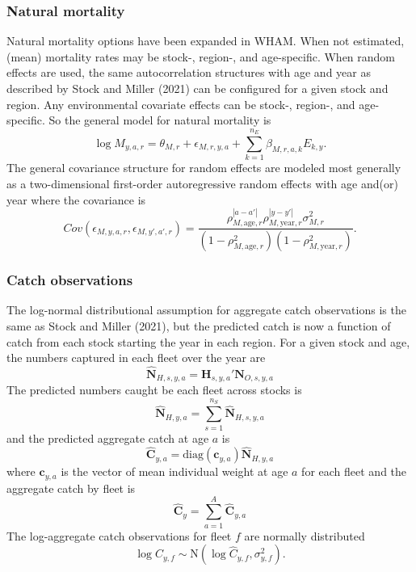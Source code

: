\documentclass[
]{article}
\begin{document}
\hypertarget{natural-mortality}{%
\subsubsection*{Natural mortality}\label{natural-mortality}}

Natural mortality options have been expanded in WHAM. When not
estimated, (mean) mortality rates may be stock-, region-, and
age-specific. When random effects are used, the same autocorrelation
structures with age and year as described by Stock and Miller (2021) can
be configured for a given stock and region. Any environmental covariate
effects can be stock-, region-, and age-specific. So the general model
for natural mortality is \begin{equation*}
  \log M_{y,a,r} = \theta_{M,r} + \epsilon_{M,r,y,a} + \sum^{n_E}_{k=1} \beta_{M,r,a,k} E_{k,y}.
\end{equation*} The general covariance structure for random effects are
modeled most generally as a two-dimensional first-order autoregressive
random effects with age and(or) year where the covariance is
\begin{equation*}
  Cov\left(\epsilon_{M,y,a,r},\epsilon_{M,y',a',r}\right) =   \frac{\rho_{M,\text{age},r}^{|a-a'|}\rho_{M,\text{year},r}^{|y-y'|}\sigma^2_{M,r}}{\left(1 -  \rho_{M,\text{age},r}^2\right)\left(1 - \rho_{M,\text{year},r}^2\right)}.
\end{equation*}

\hypertarget{catch-observations}{%
\subsubsection*{Catch observations}\label{catch-observations}}

The log-normal distributional assumption for aggregate catch
observations is the same as Stock and Miller (2021), but the predicted
catch is now a function of catch from each stock starting the year in
each region. For a given stock and age, the numbers captured in each
fleet over the year are
\[\widehat{\mathbf{N}}_{H,s,y,a} = \mathbf{H}_{s,y,a}' \mathbf{N}_{O,s,y,a}\]
The predicted numbers caught be each fleet across stocks is
\[\widehat{\mathbf{N}}_{H,y,a} = \sum^{n_S}_{s=1} \widehat{\mathbf{N}}_{H,s,y,a}\]
and the predicted aggregate catch at age \(a\) is
\[\widehat{\mathbf{C}}_{y,a} = \text{diag}\left(\mathbf{c}_{y,a}\right) \widehat{\mathbf{N}}_{H,y,a}\]
where \(\mathbf{c}_{y,a}\) is the vector of mean individual weight at
age \(a\) for each fleet and the aggregate catch by fleet is
\[\widehat{\mathbf{C}}_y = \sum^{A}_{a=1} \widehat{\mathbf{C}}_{y,a}\]
The log-aggregate catch observations for fleet \(f\) are normally
distributed
\[ \log C_{y,f} \sim \text{N}\left(\log \widehat {C}_{y,f}, \sigma^2_{y,f}\right).\]
\end{document}
